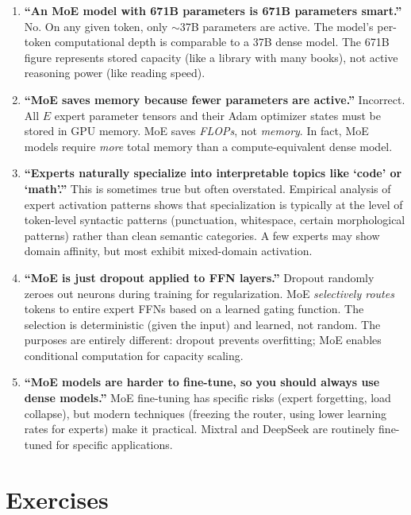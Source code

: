 \begin{enumerate}
  \item \textbf{``An MoE model with 671B parameters is 671B parameters smart.''} No. On any given token, only $\sim$37B parameters are active. The model's per-token computational depth is comparable to a 37B dense model. The 671B figure represents stored capacity (like a library with many books), not active reasoning power (like reading speed).

  \item \textbf{``MoE saves memory because fewer parameters are active.''}  Incorrect. All $E$ expert parameter tensors and their Adam optimizer states must be stored in GPU memory. MoE saves \emph{FLOPs}, not \emph{memory}. In fact, MoE models require \emph{more} total memory than a compute-equivalent dense model.

  \item \textbf{``Experts naturally specialize into interpretable topics like `code' or `math'.''} This is sometimes true but often overstated. Empirical analysis of expert activation patterns shows that specialization is typically at the level of token-level syntactic patterns (punctuation, whitespace, certain morphological patterns) rather than clean semantic categories. A few experts may show domain affinity, but most exhibit mixed-domain activation.

  \item \textbf{``MoE is just dropout applied to FFN layers.''} Dropout randomly zeroes out neurons during training for regularization. MoE \emph{selectively routes} tokens to entire expert FFNs based on a learned gating function. The selection is deterministic (given the input) and learned, not random. The purposes are entirely different: dropout prevents overfitting; MoE enables conditional computation for capacity scaling.

  \item \textbf{``MoE models are harder to fine-tune, so you should always use dense models.''} MoE fine-tuning has specific risks (expert forgetting, load collapse), but modern techniques (freezing the router, using lower learning rates for experts) make it practical. Mixtral and DeepSeek are routinely fine-tuned for specific applications.
\end{enumerate}

\section{Exercises}
\label{ch:13:sec:exercises}

